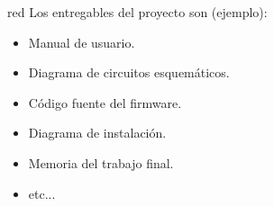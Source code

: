 \documentclass[
11pt, %
]{charter}
\begin{document}
	
		

		
		

\begin{consigna}{red}
Los entregables del proyecto son (ejemplo):

\begin{itemize}
	\item Manual de usuario.
	\item Diagrama de circuitos esquemáticos.
	\item Código fuente del firmware.
	\item Diagrama de instalación.
	\item Memoria del trabajo final.
	\item etc...
\end{itemize}
\end{consigna}
\end{document}
